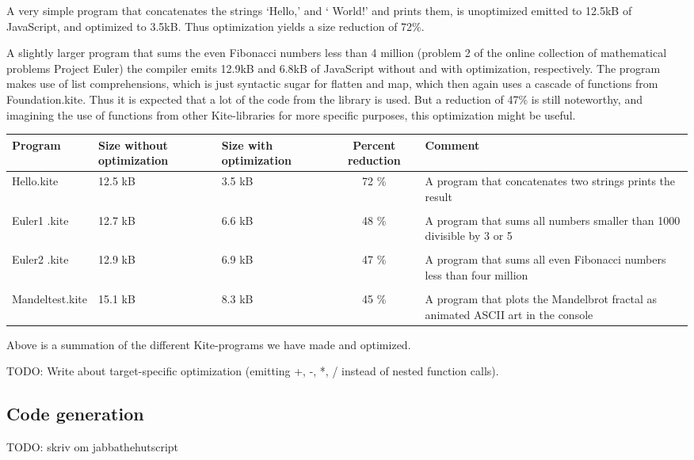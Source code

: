 A very simple program that concatenates the strings `Hello,' and ` World!' and prints them, is unoptimized emitted to 12.5kB of JavaScript, and optimized to 3.5kB. Thus optimization yields a size reduction of 72\%.

A slightly larger program that sums the even Fibonacci numbers less than 4 million (problem 2 of the online collection of mathematical problems Project Euler\cite{euler}) the compiler emits 12.9kB and 6.8kB of JavaScript without and with optimization, respectively. The program makes use of list comprehensions, which is just syntactic sugar for flatten and map, which then again uses a cascade of functions from Foundation.kite. Thus it is expected that a lot of the code from the library is used. But a reduction of 47\% is still noteworthy, and imagining the use of functions from other Kite-libraries for more specific purposes, this optimization might be useful.

\begin{center}
  \begin{tabulary}{0.9\textwidth}{|L| L |L| C | L | }
    \hline
    Program & Size without optimization & Size with optimization & Percent reduction & Comment \\
    \hline
    Hello.kite       & 12.5 kB & 3.5 kB & 72 \% & A program that concatenates two strings prints the result \\
    & & & & \\
    Euler1 .kite       & 12.7 kB & 6.6 kB & 48 \% & A program that sums all numbers smaller than 1000 divisible by 3 or 5 \\
    & & & & \\
    Euler2 .kite       & 12.9 kB & 6.9 kB & 47 \% & A program that sums all even Fibonacci numbers less than four million \\
    & & & & \\
    Mandeltest.kite       & 15.1 kB & 8.3 kB & 45 \% & A program that plots the Mandelbrot fractal as animated ASCII art in the console\\
    \hline
  \end{tabulary}

Above is a summation of the different Kite-programs we have made and optimized.
\end{center}


TODO: Write about target-specific optimization (emitting +, -, *, / instead of nested function calls).

\subsection{Code generation}
TODO: skriv om jabbathehutscript
